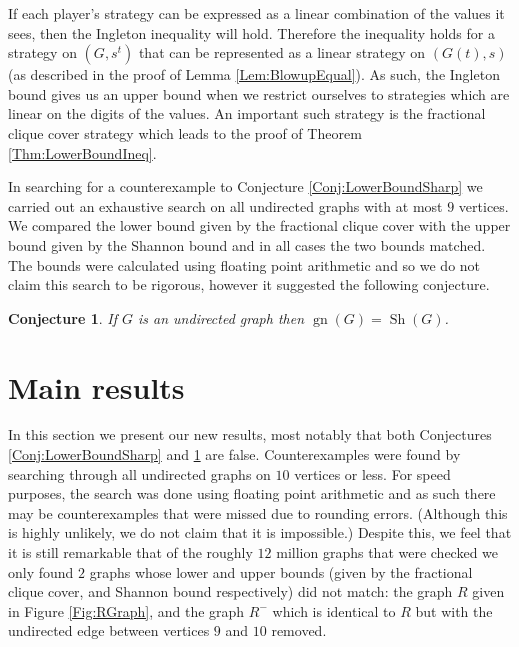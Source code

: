 \documentclass[a4paper, 14pt]{extarticle}
\theoremstyle{plain}
\newtheorem{conjecture}[proposition]{Conjecture}
\DeclareMathOperator{\gn}{gn}
\DeclareMathOperator{\Sh}{Sh}
\begin{document}
If each player's strategy can be expressed as a linear combination of the values it sees, then the Ingleton inequality will hold. Therefore the inequality holds for a strategy on $(G,s^t)$ that can be represented as a linear strategy on $(G(t),s)$ (as described in the proof of Lemma \ref{Lem:BlowupEqual}). As such, the Ingleton bound gives us an
upper bound when we restrict ourselves to strategies which are
linear on the digits of the values. An important such strategy is
the fractional clique cover strategy \cite{Christofides&Markstrom11} which leads to the proof of Theorem \ref{Thm:LowerBoundIneq}.


In searching for a counterexample to Conjecture
\ref{Conj:LowerBoundSharp} we carried out an exhaustive search on
all undirected graphs with at most $9$ vertices. We compared the
lower bound given by the fractional clique cover with the upper
bound given by the Shannon bound and in all cases the two bounds
matched. The bounds were calculated using floating point arithmetic
and so we do not claim this search to be rigorous, however it suggested
the following conjecture.

\begin{conjecture}\label{Conj:UpperBoundSharp}
If $G$ is an undirected graph then $\gn(G) = \Sh(G)$. 
\end{conjecture}

\section{Main results}\label{Sec:Main}

In this section we present our new results, most notably that both
Conjectures \ref{Conj:LowerBoundSharp} and
\ref{Conj:UpperBoundSharp} are false. Counterexamples were found by
searching through all undirected graphs on $10$ vertices or less.
For speed purposes, the search was done using floating point
arithmetic and as such there may be counterexamples that were missed
due to rounding errors. (Although this is highly unlikely, we do not
claim that it is impossible.) Despite this, we feel that it is still remarkable
that of the roughly $12$ million graphs that were checked we only
found $2$ graphs whose lower and upper bounds (given by the
fractional clique cover, and Shannon bound respectively) did not
match: the graph $R$ given in Figure \ref{Fig:RGraph}, and the graph
$R^-$ which is identical to $R$ but with the undirected edge between
vertices $9$ and $10$ removed. 
\end{document}
